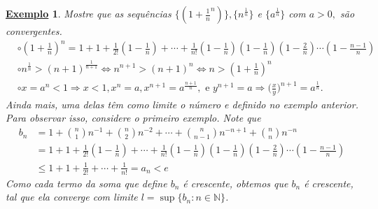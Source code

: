 \documentclass{article}
\newtheorem{example}{\underline{Exemplo}}
\begin{document}
\begin{example}
  Mostre que as sequ\^encias $\biggl\{(1+\frac{1}{n}^{n})\biggr\}, \{n^{\frac{1}{n}}\}$ e $\{a^{\frac{1}{n}}\}$ com $a >0,$ s\~ao
convergentes.
 \begin{align*}
   &\circ (1+\frac{1}{n})^{n} = 1 + 1 + \frac{1}{2!}(1-\frac{1}{n}) + \cdots + \frac{1}{n!}(1-\frac{1}{n})(1-\frac{1}{n})(1-\frac{2}{n})\cdots(1-\frac{n-1}{n})\\
   &\circ n^{\frac{1}{n}} > (n+1)^{\frac{1}{n+1}}\Longleftrightarrow n^{n+1} > (n+1)^{n}\Longleftrightarrow n>(1+\frac{1}{n})^{n}\\
   &\circ x = a^{n} < 1\Rightarrow x < 1, x^{n} = a, x^{n+1} = a^{\frac{n+1}{n}},\text{ e } y^{n+1} = a \Rightarrow \biggl(\frac{x}{y}\biggr)^{n+1} = a^{\frac{1}{n}}.
 \end{align*}
   Ainda mais, uma delas t\^em como limite o n\'umero e definido no exemplo anterior. Para observar isso, considere o primeiro exemplo. Note que
  \begin{align*}
    b_{n} &= 1 + \binom{n}{1}n^{-1} + \binom{n}{2}n^{-2} + \cdots + \binom{n}{n-1}n^{-n+1} + \binom{n}{n}n^{-n} \\ 
          &= 1 + 1 + \frac{1}{2!}(1-\frac{1}{n}) + \cdots + \frac{1}{n!}(1-\frac{1}{n})(1-\frac{1}{n})(1-\frac{2}{n})\cdots(1-\frac{n-1}{n})\\
          &\leq{1 + 1 + \frac{1}{2!} + \cdots + \frac{1}{n!} = a_{n} < e}
 \end{align*}
 Como cada termo da soma que define $b_{n}$ \'e crescente, obtemos que $b_{n}$ \'e crescente, tal que ela converge com limite $l = \sup{\{b_{n}:n\in \mathbb{N}\}}$.
  

\end{example}
\end{document}
